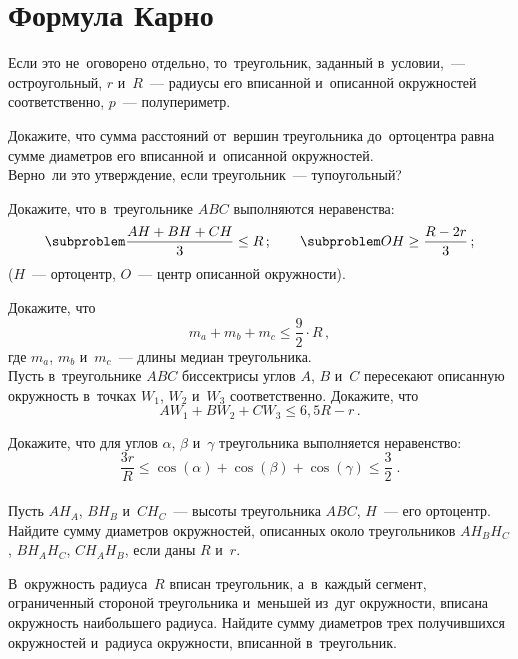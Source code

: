 
\section*{Формула Карно}


Если это не~оговорено отдельно, то~треугольник, заданный в~условии,~---
остроугольный, $r$ и~$R$~--- радиусы его вписанной и~описанной окружностей
соответственно, $p$~--- полупериметр.

\begin{problems}

\item
\subproblem
Докажите, что сумма расстояний от~вершин треугольника до~ортоцентра равна сумме
диаметров его вписанной и~описанной окружностей.
\\
\subproblem
Верно~ли это утверждение, если треугольник~--- тупоугольный?

\item
Докажите, что в~треугольнике $ABC$ выполняются неравенства:
\[
\subproblem
    \frac{AH + BH + CH}{3} \leq R
\, ; \qquad
\subproblem
    OH \geq \frac{R - 2 r}{3}
\, ; \]
($H$~--- ортоцентр, $O$~--- центр описанной окружности).

\item
\subproblem
Докажите, что
\[
    m_a + m_b + m_c
\leq
    \frac{9}{2} \cdot R
\, , \]
где $m_a$, $m_b$ и~$m_c$~--- длины медиан треугольника.
\\
\subproblem
Пусть в~треугольнике $ABC$ биссектрисы углов $A$, $B$ и~$C$ пересекают
описанную окружность в~точках $W_1$, $W_2$ и~$W_3$ соответственно.
Докажите, что
\[
    A W_1 + B W_2 + C W_3
\leq
    6{,}5 R - r
\, . \]

\item
\subproblem
Докажите, что для углов $\alpha$, $\beta$ и~$\gamma$ треугольника выполняется
неравенство:
\[
    \frac{3 r}{R}
\leq
    \cos(\alpha) + \cos(\beta) + \cos(\gamma)
\leq
    \frac{3}{2}
\; . \]
\\
\subproblem
Пусть $A H_A$, $B H_B$ и~$C H_C$~--- высоты треугольника $ABC$, $H$~---
его ортоцентр.
Найдите сумму диаметров окружностей, описанных около треугольников
$A H_B H_C$, $B H_A H_C$, $C H_A H_B$, если даны $R$ и~$r$.

\item
В~окружность радиуса~$R$ вписан треугольник, а~в~каждый сегмент, ограниченный
стороной треугольника и~меньшей из~дуг окружности, вписана окружность
наибольшего радиуса.
Найдите сумму диаметров трех получившихся окружностей и~радиуса окружности,
вписанной в~треугольник.


\end{problems}
